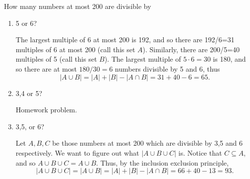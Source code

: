 \documentclass[11pt,dvipsnames]{book}
\numberwithin{figure}{section} %
\numberwithin{table}{section} %
\begin{document}
\begin{exercise}
How many numbers at most 200 are divisible by
\begin{enumerate}[label=(\alph*)]
\item 5 or 6?
\begin{solution}
The largest multiple of 6 at most 200 is 192, and so there are 192/6=31 multiples of 6 at most 200 (call this set $A$). Similarly, there are 200/5=40 multiples of 5 (call this set $B$). The largest multiple of $5\cdot 6=30$ is 180, and so there are at most $180/30=6$ numbers divisible by 5 and 6, thus
\[
|A\cup B| = |A|+|B|-|A\cap B| = 31+40-6 = 65.
\]
\end{solution}
\item 3,4 or 5?
\begin{solution}
Homework problem.
\end{solution}
\item 3,5, or 6?
\begin{solution}
Let $A,B,C$ be those numbers at most 200 which are divisible by 3,5 and 6 respectively. We want to figure out what $|A\cup B\cup C|$ is. Notice that $C\subseteq A$, and so $A\cup B\cup C = A\cup B$. Thus, by the inclusion exclusion principle,
\[
|A\cup B\cup C|=| A\cup B|=|A|+|B|-|A\cap B|
=66 + 40-13 = 93.
\]
\end{solution}
\end{enumerate}
\end{exercise}
\end{document}
